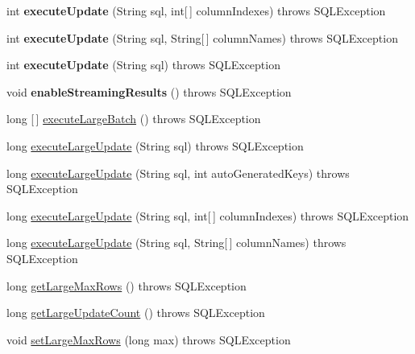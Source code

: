 \begin{DoxyCompactItemize}
int {\bfseries execute\+Update} (String sql, int\mbox{[}$\,$\mbox{]} column\+Indexes)  throws S\+Q\+L\+Exception 
\item 
\mbox{\label{classcom_1_1mysql_1_1jdbc_1_1jdbc2_1_1optional_1_1_statement_wrapper_a63066b6f97a28b026b633b37939d23f9}} 
int {\bfseries execute\+Update} (String sql, String\mbox{[}$\,$\mbox{]} column\+Names)  throws S\+Q\+L\+Exception 
\item 
\mbox{\label{classcom_1_1mysql_1_1jdbc_1_1jdbc2_1_1optional_1_1_statement_wrapper_ad3d592dd9b70cdcda31f85c86e92506b}} 
int {\bfseries execute\+Update} (String sql)  throws S\+Q\+L\+Exception 
\item 
\mbox{\label{classcom_1_1mysql_1_1jdbc_1_1jdbc2_1_1optional_1_1_statement_wrapper_a04782625362e3f0220c8fcc513029bc5}} 
void {\bfseries enable\+Streaming\+Results} ()  throws S\+Q\+L\+Exception 
\item 
long \mbox{[}$\,$\mbox{]} \mbox{\hyperlink{classcom_1_1mysql_1_1jdbc_1_1jdbc2_1_1optional_1_1_statement_wrapper_ac0104dd3c2bc950cc6305c706dd6d755}{execute\+Large\+Batch}} ()  throws S\+Q\+L\+Exception 
\item 
long \mbox{\hyperlink{classcom_1_1mysql_1_1jdbc_1_1jdbc2_1_1optional_1_1_statement_wrapper_ad507c431dc5aeb1633d055928964e3e6}{execute\+Large\+Update}} (String sql)  throws S\+Q\+L\+Exception 
\item 
long \mbox{\hyperlink{classcom_1_1mysql_1_1jdbc_1_1jdbc2_1_1optional_1_1_statement_wrapper_a1ff0033f0957c6f71d7d3edd7e93cddf}{execute\+Large\+Update}} (String sql, int auto\+Generated\+Keys)  throws S\+Q\+L\+Exception 
\item 
long \mbox{\hyperlink{classcom_1_1mysql_1_1jdbc_1_1jdbc2_1_1optional_1_1_statement_wrapper_a1c71bf59f2f43573b6b83fed9c446dfb}{execute\+Large\+Update}} (String sql, int\mbox{[}$\,$\mbox{]} column\+Indexes)  throws S\+Q\+L\+Exception 
\item 
long \mbox{\hyperlink{classcom_1_1mysql_1_1jdbc_1_1jdbc2_1_1optional_1_1_statement_wrapper_a0ffa4414e744b296f60c78d233576cbe}{execute\+Large\+Update}} (String sql, String\mbox{[}$\,$\mbox{]} column\+Names)  throws S\+Q\+L\+Exception 
\item 
long \mbox{\hyperlink{classcom_1_1mysql_1_1jdbc_1_1jdbc2_1_1optional_1_1_statement_wrapper_a39c30135705aeb504df9b4cc3bc3d9d0}{get\+Large\+Max\+Rows}} ()  throws S\+Q\+L\+Exception 
\item 
long \mbox{\hyperlink{classcom_1_1mysql_1_1jdbc_1_1jdbc2_1_1optional_1_1_statement_wrapper_ab10ae1c56164b3ca0adc9ce442bc5d10}{get\+Large\+Update\+Count}} ()  throws S\+Q\+L\+Exception 
\item 
void \mbox{\hyperlink{classcom_1_1mysql_1_1jdbc_1_1jdbc2_1_1optional_1_1_statement_wrapper_a788a8f9deda0587bfef126ec416e28e5}{set\+Large\+Max\+Rows}} (long max)  throws S\+Q\+L\+Exception 
\end{DoxyCompactItemize}
